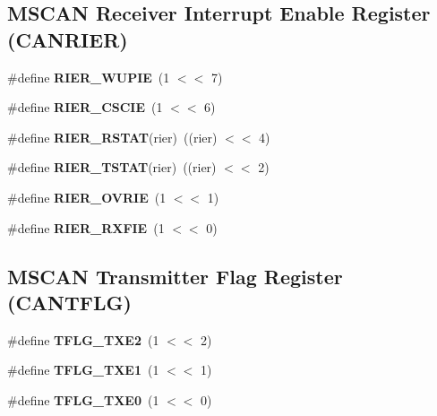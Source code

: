 \subsection*{M\+S\+C\+AN Receiver Interrupt Enable Register (C\+A\+N\+R\+I\+ER)}
\begin{DoxyCompactItemize}
\item 
\mbox{\label{group__RTEMSBSPsPowerPCGen5200MSCAN_ga50447324a60f426cc99f3f7ee5242375}} 
\#define {\bfseries R\+I\+E\+R\+\_\+\+W\+U\+P\+IE}~(1 $<$$<$ 7)
\item 
\mbox{\label{group__RTEMSBSPsPowerPCGen5200MSCAN_ga5d63959fb853349ebba010f2b555ac56}} 
\#define {\bfseries R\+I\+E\+R\+\_\+\+C\+S\+C\+IE}~(1 $<$$<$ 6)
\item 
\mbox{\label{group__RTEMSBSPsPowerPCGen5200MSCAN_ga13c2d82b4f1f056dd2f9d8fb3ea2edaa}} 
\#define {\bfseries R\+I\+E\+R\+\_\+\+R\+S\+T\+AT}(rier)~((rier) $<$$<$ 4)
\item 
\mbox{\label{group__RTEMSBSPsPowerPCGen5200MSCAN_gab5bf9ad793b519c154d9b6ba721926a5}} 
\#define {\bfseries R\+I\+E\+R\+\_\+\+T\+S\+T\+AT}(rier)~((rier) $<$$<$ 2)
\item 
\mbox{\label{group__RTEMSBSPsPowerPCGen5200MSCAN_ga5f35ce66277b56188b5b36bde3e3f4f7}} 
\#define {\bfseries R\+I\+E\+R\+\_\+\+O\+V\+R\+IE}~(1 $<$$<$ 1)
\item 
\mbox{\label{group__RTEMSBSPsPowerPCGen5200MSCAN_ga95a9d8d932bc35765961a8bc00b0eec5}} 
\#define {\bfseries R\+I\+E\+R\+\_\+\+R\+X\+F\+IE}~(1 $<$$<$ 0)
\end{DoxyCompactItemize}
\subsection*{M\+S\+C\+AN Transmitter Flag Register (C\+A\+N\+T\+F\+LG)}
\begin{DoxyCompactItemize}
\item 
\mbox{\label{group__RTEMSBSPsPowerPCGen5200MSCAN_gad36cf8eaa7ba4a01805b1cde8164ba01}} 
\#define {\bfseries T\+F\+L\+G\+\_\+\+T\+X\+E2}~(1 $<$$<$ 2)
\item 
\mbox{\label{group__RTEMSBSPsPowerPCGen5200MSCAN_ga9d7c9b9a953d4ae1ac704a71db41e213}} 
\#define {\bfseries T\+F\+L\+G\+\_\+\+T\+X\+E1}~(1 $<$$<$ 1)
\item 
\mbox{\label{group__RTEMSBSPsPowerPCGen5200MSCAN_ga8efcaac9e2d49e0c42eac9660f2df95d}} 
\#define {\bfseries T\+F\+L\+G\+\_\+\+T\+X\+E0}~(1 $<$$<$ 0)
\end{DoxyCompactItemize}
